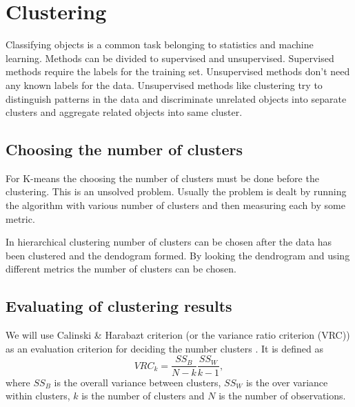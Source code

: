 \section{Clustering}
Classifying objects is a common task belonging to statistics and 
machine learning. Methods can be divided to supervised and 
unsupervised. Supervised methods require the labels for the training
set. Unsupervised methods don't need any known labels for the data.
Unsupervised methods like clustering try to distinguish patterns 
in the data and discriminate unrelated objects into separate 
clusters and aggregate related objects into same cluster.



\subsection{Choosing the number of clusters}

For K-means the choosing the number of clusters must be done before
the clustering.  This is an unsolved problem. 
Usually the 
problem is dealt by running the algorithm with various number of 
clusters and then measuring each by some metric. 

In hierarchical clustering number of clusters can be chosen after 
the data has been clustered and the dendogram 
 formed.
 By 
looking the dendrogram and using different metrics the number of 
clusters can be chosen.


\subsection{Evaluating of clustering results}
We will use Calinski \& Harabazt criterion (or the variance ratio 
criterion (VRC)) as an evaluation criterion for 
deciding the number clusters \cite{calinski_dendrite_1974}. It 
is defined as
\begin{equation}
 VRC_k = \frac{SS_B}{N-k} \frac{SS_W}{k-1},
\end{equation}
where $SS_B$ is the overall variance between clusters, $SS_W$ is 
the over variance within clusters, $k$ is the number of clusters 
and $N$ is the number of observations.

